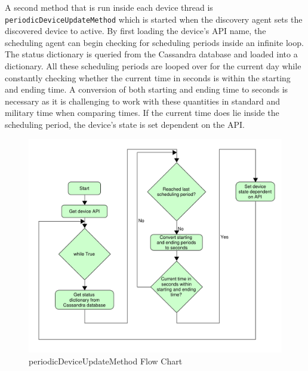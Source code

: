A second method that is run inside each device thread is \texttt{periodicDeviceUpdateMethod} which is started when the discovery agent sets the discovered device to active. By first loading the device's API name, the scheduling agent can begin checking for scheduling periods inside an infinite loop. The status dictionary is queried from the Cassandra database and loaded into a dictionary. All these scheduling periods are looped over for the current day while constantly checking whether the current time in seconds is within the starting and ending time. A conversion of both starting and ending time to seconds is necessary as it is challenging to work with these quantities in standard and military time when comparing times. If the current time does lie inside the scheduling period, the device's state is set dependent on the API. 
\begin{figure}[H]
    \centering
    \includegraphics[scale=0.5]{figs/periodicDeviceUpdateMethod.pdf}
    \caption{periodicDeviceUpdateMethod Flow Chart}
    \label{fig:periodicDeviceUpdateMethod}
\end{figure}

